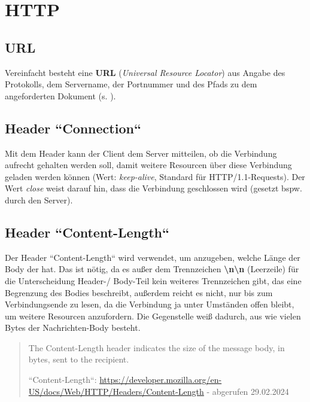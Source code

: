 \section{HTTP}

\subsection{URL}

Vereinfacht besteht eine \textbf{URL} (\textit{Universal Resource Locator}) aus Angabe des Protokolls, dem Servername, der Portnummer und des Pfads zu dem angeforderten Dokument (s. \cite[403]{Oec22}).

\subsection{Header ``Connection``}
Mit dem Header kann der Client dem Server mitteilen, ob die Verbindung aufrecht gehalten werden soll, damit weitere Resourcen über diese Verbindung geladen werden können (Wert: \textit{keep-alive}, Standard für HTTP/1.1-Requests).
Der Wert \textit{close} weist darauf hin, dass die Verbindung geschlossen wird (gesetzt bspw. durch den Server).

\subsection{Header ``Content-Length``}
Der Header ``Content-Length`` wird verwendet, um anzugeben, welche Länge der Body der hat.
Das ist nötig, da es außer dem Trennzeichen \textbf{\textbackslash n\textbackslash n} (Leerzeile) für die Unterscheidung Header-/ Body-Teil kein weiteres Trennzeichen gibt, das eine Begrenzung des Bodies beschreibt, außerdem reicht es nicht, nur bis zum Verbindungsende zu lesen, da die Verbindung ja unter Umständen offen bleibt, um weitere Resourcen anzufordern.
Die Gegenstelle weiß dadurch, aus wie vielen Bytes der Nachrichten-Body besteht.

\blockquote[{``Content-Length``: \url{https://developer.mozilla.org/en-US/docs/Web/HTTP/Headers/Content-Length} - abgerufen 29.02.2024}]{
    The Content-Length header indicates the size of the message body, in bytes, sent to the recipient.
}